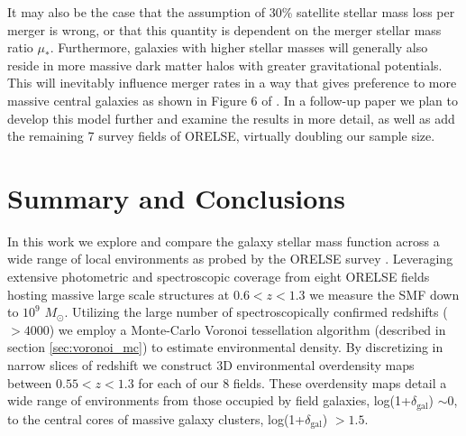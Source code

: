 \documentclass[a4paper,fleqn,usenatbib]{mnras}
\def\msol{$M_{\odot}$}
\begin{document}
It may also be the case that the assumption of 30\% satellite stellar mass loss per merger is wrong, or that this quantity is dependent on the merger stellar mass ratio $\mu_*$.
Furthermore, galaxies with higher stellar masses will generally also reside in more massive dark matter halos with greater gravitational potentials.
This will inevitably influence merger rates in a way that gives preference to more massive central galaxies as shown in Figure 6 of \citet{RodriguezGomez2015}.
In a follow-up paper we plan to develop this model further and examine the results in more detail, as well as add the remaining 7 survey fields of ORELSE, virtually doubling our sample size.







\section{Summary and Conclusions}
\label{sec:summaryandconclusions}


In this work we explore and compare the galaxy stellar mass function across a wide range of local environments as probed by the ORELSE survey \citep{Lubin2009}.
Leveraging extensive photometric and spectroscopic coverage from eight ORELSE fields hosting massive large scale structures at $0.6 < z < 1.3$ we measure the SMF down to $10^9$ \msol .
Utilizing the large number of spectroscopically confirmed redshifts ($>4000$) we employ a Monte-Carlo Voronoi tessellation algorithm (described in section \ref{sec:voronoi_mc}) to estimate environmental density.
By discretizing in narrow slices of redshift we construct 3D environmental overdensity maps between $0.55 < z < 1.3$ for each of our 8 fields.
These overdensity maps detail a wide range of environments from those occupied by field galaxies, log(1+$\delta_{\mathrm{gal}}$) $\sim 0$, to the central cores of massive galaxy clusters, log(1+$\delta_{\mathrm{gal}}$) $> 1.5$.
\end{document}
